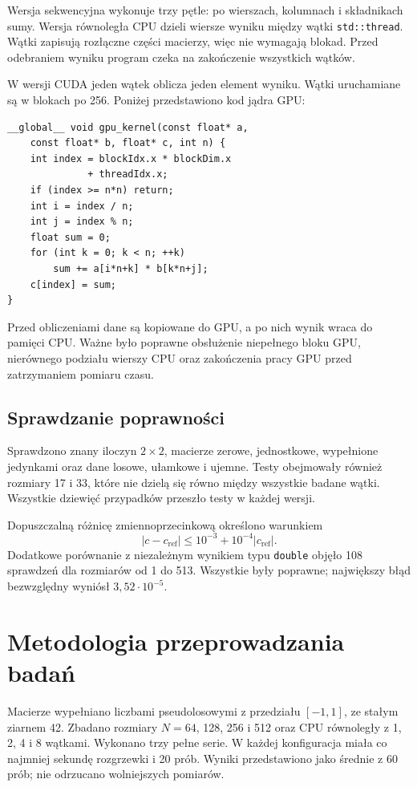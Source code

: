 \documentclass[12pt,a4paper]{article}
\begin{document}
Wersja sekwencyjna wykonuje trzy pętle: po wierszach, kolumnach
i składnikach sumy. Wersja równoległa CPU dzieli wiersze wyniku
między wątki \texttt{std::thread}. Wątki zapisują rozłączne części
macierzy, więc nie wymagają blokad. Przed odebraniem wyniku program
czeka na zakończenie wszystkich wątków.

W wersji CUDA jeden wątek oblicza jeden element wyniku.
Wątki uruchamiane są w blokach po 256. Poniżej przedstawiono
kod jądra GPU:
\begin{lstlisting}
__global__ void gpu_kernel(const float* a,
    const float* b, float* c, int n) {
    int index = blockIdx.x * blockDim.x
              + threadIdx.x;
    if (index >= n*n) return;
    int i = index / n;
    int j = index % n;
    float sum = 0;
    for (int k = 0; k < n; ++k)
        sum += a[i*n+k] * b[k*n+j];
    c[index] = sum;
}
\end{lstlisting}
Przed obliczeniami dane są kopiowane do GPU, a po nich wynik wraca
do pamięci CPU. Ważne było poprawne obsłużenie niepełnego bloku GPU,
nierównego podziału wierszy CPU oraz zakończenia pracy GPU przed
zatrzymaniem pomiaru czasu.

\subsection{Sprawdzanie poprawności}

Sprawdzono znany iloczyn $2\times2$, macierze zerowe, jednostkowe,
wypełnione jedynkami oraz dane losowe, ułamkowe i ujemne.
Testy obejmowały również rozmiary 17 i 33, które nie dzielą się
równo między wszystkie badane wątki. Wszystkie dziewięć przypadków
przeszło testy w każdej wersji.

Dopuszczalną różnicę zmiennoprzecinkową określono warunkiem
\begin{equation}
|c-c_{\mathrm{ref}}|\leq10^{-3}+10^{-4}|c_{\mathrm{ref}}|.
\end{equation}
Dodatkowe porównanie z niezależnym wynikiem typu \texttt{double}
objęło 108 sprawdzeń dla rozmiarów od 1 do 513. Wszystkie były
poprawne; największy błąd bezwzględny wyniósł
$3{,}52\cdot10^{-5}$.

\section{Metodologia przeprowadzania badań}

Macierze wypełniano liczbami pseudolosowymi z przedziału $[-1,1]$,
ze stałym ziarnem 42. Zbadano rozmiary $N=64$, 128, 256 i 512
oraz CPU równoległy z 1, 2, 4 i 8 wątkami.
Wykonano trzy pełne serie. W każdej konfiguracja miała co najmniej
sekundę rozgrzewki i 20 prób. Wyniki przedstawiono jako średnie
z 60 prób; nie odrzucano wolniejszych pomiarów.
\end{document}
